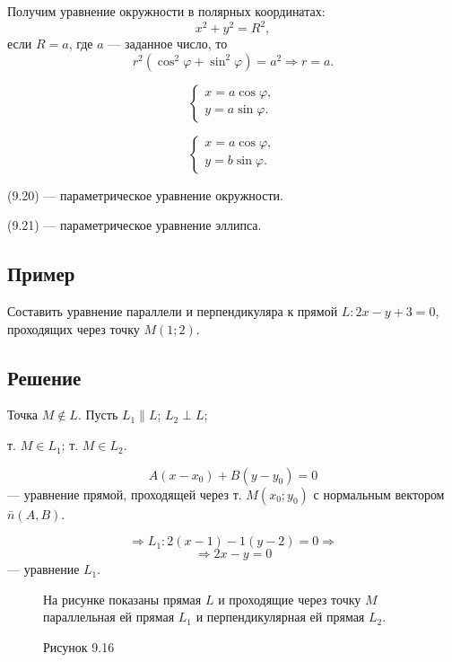 \documentclass[12pt,a4paper]{article}
\newcommand{\vn}{\bar n}
\begin{document}
Получим уравнение окружности в полярных координатах:
$$
x^2+y^2=R^2,
$$
если $R=a$, где $a$ --- заданное число, то
$$
r^2(\cos^2\varphi+\sin^2\varphi)=a^2
\Rightarrow r=a.
$$

\begin{equation}
  \begin{cases}
    x=a\cos\varphi,\\
    y=a\sin\varphi.
  \end{cases}
  \tag{9.20}
\end{equation}

\begin{equation}
  \begin{cases}
    x=a\cos\varphi,\\
    y=b\sin\varphi.
  \end{cases}
  \tag{9.21}
\end{equation}

(9.20) --- параметрическое уравнение окружности.

(9.21) --- параметрическое уравнение эллипса.

\subsection*{\textbf{Пример}}

Составить уравнение параллели и перпендикуляра к прямой $L:2x-y+3=0$,
проходящих через точку $M(1;2)$.

\subsection*{\textbf{Решение}}

Точка $M\notin L$. Пусть $L_1\parallel L$; $L_2\perp L$;

т. $M\in L_1$; т. $M\in L_2$.

$$
A(x-x_0)+B(y-y_0)=0
$$
--- уравнение прямой, проходящей через т. $M(x_0;y_0)$ с нормальным
вектором $\vn(A,B)$.

$$
\Rightarrow L_1:2(x-1)-1(y-2)=0
\Rightarrow
$$
$$
\Rightarrow 2x-y=0
$$
--- уравнение $L_1$.

\begin{figure}[H]
  \centering
  \begin{minipage}{0.4\textwidth}
    \centering
    \caption*{Рисунок 9.16}
  \end{minipage}%
  \begin{minipage}{0.55\textwidth}
    На рисунке показаны прямая $L$ и проходящие через точку $M$
    параллельная ей прямая $L_1$ и перпендикулярная ей прямая $L_2$.
  \end{minipage}
\end{figure}
\end{document}
